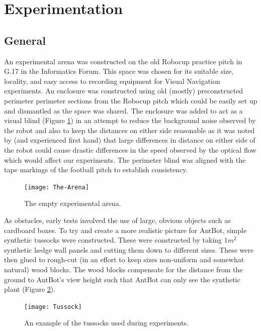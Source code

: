 \documentclass[a4paper,12pt,twoside,openright]{article}
\begin{document}
\section{Experimentation}\label{sec:test}
\subsection{General}
An experimental arena was constructed on the old Robocup practice pitch in G.17 in the Informatics Forum. This space was chosen
for its suitable size, locality, and easy access to recording equipment for Visual Navigation experiments. An enclosure was constructed
using old (mostly) preconstructed perimeter perimeter sections from the Robocup pitch which could be easily set up and dismantled as the
space was shared. The enclosure was added to act as a visual blind (Figure \ref{fig:arena}) in an attempt to reduce the background noise observed by the robot and
also to keep the distances on either side reasonable as it was noted by \cite{Scimeca2017} (and experienced first hand) that large differences
in distance on either side of the robot could cause drastic differences in the speed observed by the optical flow which would affect our
experiments. The perimeter blind was aligned with the tape markings of the football pitch to establish consistency.
\newline


\begin{figure}
  \centering
  \texttt{[image: The-Arena]}
  \caption{
    \label{fig:arena} The empty experimental arena.
  }
\end{figure}

As obstacles, early tests involved the use of large, obvious objects such as cardboard boxes. To try and create a more realistic
picture for AntBot, simple synthetic tussocks were constructed. These were constructed by taking $1m^2$ synthetic hedge wall panels and
cutting them down to different sizes. These were then glued to rough-cut (in an effort to keep sizes non-uniform and somewhat
natural) wood blocks. The wood blocks compensate for the distance from the ground to AntBot's view height such that AntBot can only
see the synthetic plant (Figure \ref{fig:tussock}).
\newline

\begin{figure}[h]
  \centering
  \texttt{[image: Tussock]}
  \caption{
    \label{fig:tussock} An example of the tussocks used during experiments.
  }
\end{figure}
\end{document}
